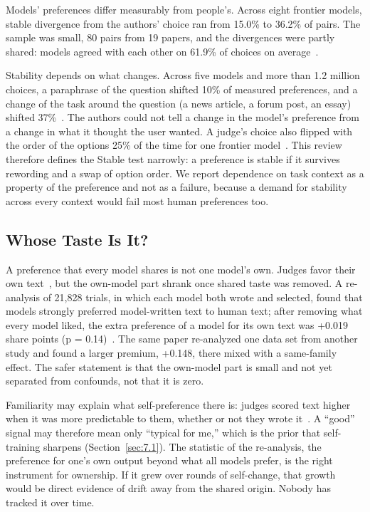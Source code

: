 \documentclass[journal]{IEEEtran}
\begin{document}
Models' preferences differ measurably from people's. Across eight frontier models, stable divergence from the authors' choice ran from 15.0\% to 36.2\% of pairs. The sample was small, 80 pairs from 19 papers, and the divergences were partly shared: models agreed with each other on 61.9\% of choices on average~\cite{Trehan2026}.

Stability depends on what changes. Across five models and more than 1.2 million choices, a paraphrase of the question shifted 10\% of measured preferences, and a change of the task around the question (a news article, a forum post, an essay) shifted 37\%~\cite{Trhlik2026}. The authors could not tell a change in the model's preference from a change in what it thought the user wanted. A judge's choice also flipped with the order of the options 25\% of the time for one frontier model~\cite{Panickssery2024}. This review therefore defines the Stable test narrowly: a preference is stable if it survives rewording and a swap of option order. We report dependence on task context as a property of the preference and not as a failure, because a demand for stability across every context would fail most human preferences too.

\subsection{Whose Taste Is It?}\label{sec:8.3}

A preference that every model shares is not one model's own. Judges favor their own text~\cite{Panickssery2024}, but the own-model part shrank once shared taste was removed. A re-analysis of 21,828 trials, in which each model both wrote and selected, found that models strongly preferred model-written text to human text; after removing what every model liked, the extra preference of a model for its own text was +0.019 share points (p = 0.14)~\cite{Zatuchin2026}. The same paper re-analyzed one data set from another study and found a larger premium, +0.148, there mixed with a same-family effect. The safer statement is that the own-model part is small and not yet separated from confounds, not that it is zero.

Familiarity may explain what self-preference there is: judges scored text higher when it was more predictable to them, whether or not they wrote it~\cite{Wataoka2024}. A ``good'' signal may therefore mean only ``typical for me,'' which is the prior that self-training sharpens (Section~\ref{sec:7.1}). The statistic of the re-analysis, the preference for one's own output beyond what all models prefer, is the right instrument for ownership. If it grew over rounds of self-change, that growth would be direct evidence of drift away from the shared origin. Nobody has tracked it over time.
\end{document}
